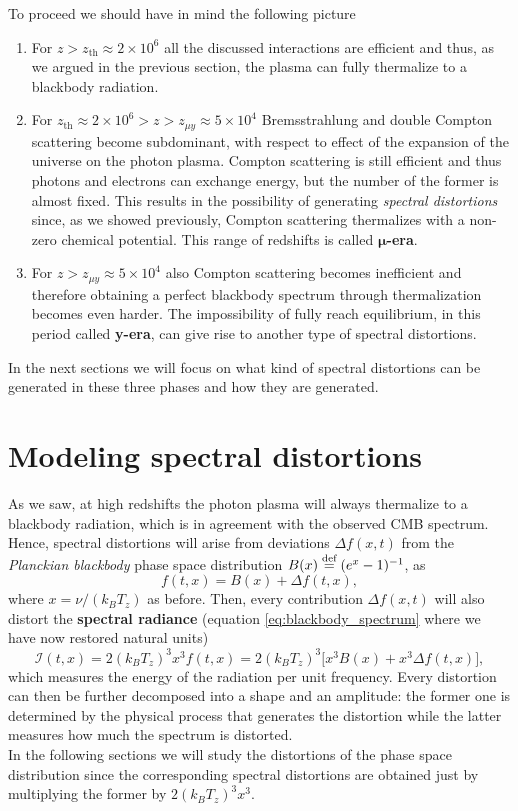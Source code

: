 To proceed we should have in mind the following picture
\begin{enumerate}
    \item For $z>z_{\text{th}}\approx2\times10^6$ all the discussed interactions are efficient and thus, as we argued in the previous section, the plasma can fully thermalize to a blackbody radiation.
    \item For $z_{\text{th}}\approx2\times10^6>z>z_{\mu y}\approx 5\times 10^4$ Bremsstrahlung and double Compton scattering become subdominant, with respect to effect of the expansion of the universe on the photon plasma. Compton scattering is still efficient and thus photons and electrons can exchange energy, but the number of the former is almost fixed. This results in the possibility of generating \emph{spectral distortions} since, as we showed previously, Compton scattering thermalizes with a non-zero chemical potential. This range of redshifts is called $\boldsymbol{\mu}$\textbf{-era}.
    \item For $z>z_{\mu y}\approx 5\times 10^4$ also Compton scattering becomes inefficient and therefore obtaining a perfect blackbody spectrum through thermalization becomes even harder. The impossibility of fully reach equilibrium, in this period called \textbf{y-era}, can give rise to another type of spectral distortions.
\end{enumerate}
In the next sections we will focus on what kind of spectral distortions can be generated in these three phases and how they are generated.
\section{Modeling spectral distortions}
As we saw, at high redshifts the photon plasma will always thermalize to a blackbody radiation, which is in agreement with the observed CMB spectrum. Hence, spectral distortions will arise from deviations $\Delta f(x,t)$ from the \emph{Planckian blackbody} phase space distribution $B(x)\stackrel{\text{def}}{=}(e^x-1)^{-1}$, as$$f(t,x)=B(x)+\Delta f(t,x),$$ where $x=\nu/(k_BT_z)$ as before. Then, every contribution $\Delta f(x,t)$ will also distort the \textbf{spectral radiance} (equation \eqref{eq:blackbody_spectrum} where we have now restored natural units) $$\mathcal{I}(t,x)=2(k_BT_z)^3 x^3f(t,x)=2(k_BT_z)^3\big[x^3B(x)+x^3\Delta f(t,x)\big],$$ which measures the energy of the radiation per unit frequency. Every distortion can then be further decomposed into a shape and an amplitude: the former one is determined by the physical process that generates the distortion while the latter measures how much the spectrum is distorted.\\
In the following sections we will study the distortions of the phase space distribution since the corresponding spectral distortions are obtained just by multiplying the former by $2(k_BT_z)^3x^3$.
